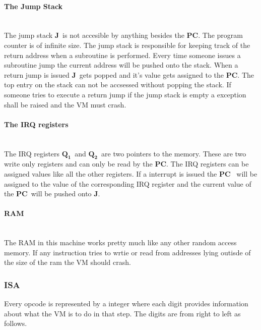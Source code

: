 \documentclass{article}
\newcommand{\q}{$\textbf{Q}_{\textbf{1}}$}
\newcommand{\qq}{$\textbf{Q}_{\textbf{2}}$}
\newcommand{\pc}{$\textbf{PC}$}
\newcommand{\J}{$\textbf{J}$}
\begin{document}
\paragraph{The Jump Stack} \
\\
The jump stack \J \ is not accesible by anything besides the \pc. The program
counter is of infinite size. The jump stack is responsible for keeping track
of the return address when a subroutine is performed. Every time someone
issues a subroutine jump the current address will be pushed onto the stack.
When a return jump is issued \J \ gets popped and it's value gets assigned to
the \pc. The top entry on the stack can not be accsessed without popping the
stack.
If someone tries to execute a return jump if the jump stack is empty a exception
shall be raised and the VM must crash.

\paragraph{The IRQ registers} \
\\
The IRQ registers \q \ and \qq \ are two pointers to the memory. These are two
write only registers and can only be read by the \pc. The IRQ registers can be
assigned values like all the other registers.  If a interrupt is issued the \pc
\ will be assigned to the value of the corresponding IRQ register and the current
value of the \pc \ will be pushed onto \J.

\paragraph{RAM} \
\\
The RAM in this machine works pretty much like any other random access
memory. If any instruction tries to wrtie or read from addresses lying outisde
of the size of the ram the VM should crash.

\subsubsection{ISA}
Every opcode is represented by a integer where each digit provides
information about what the VM is to do in that step. The digits are from right
to left as follows.
\end{document}
